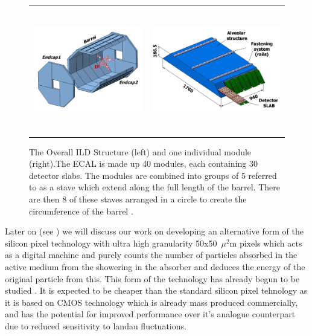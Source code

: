 \begin{figure}[h]
  \centering
  \begin{tabular}[c]{cc}
  \includegraphics[height=5.5cm]{Experiments/fig/ECALview_global_annot} &
  \includegraphics[height=5.5cm]{Experiments/fig/ECALview_module_annot} 
  \end{tabular}
  \caption[ECAL Structure]{The Overall ILD Structure (left) and one individual module (right).The ECAL is made up 40 modules, each containing 30 detector slabs. The modules are combined into groups of 5 referred to as a stave which extend along the full length of the barrel. There are then 8 of these staves arranged in a circle to create the circumference of the barrel \cite{ILD}.}
  \label{Fig:ECAL}
\end{figure}

Later on (see ) we will discuss our work on developing an alternative form of the silicon pixel technology with ultra high granularity 50x50~$\mu^2$m pixels which acts as a digital machine and purely counts the number of particles absorbed in the active medium from the showering in the absorber and deduces the energy of the original particle from this.  This form of the technology has already begun to be studied \cite{2011JInst...6.5009B}. It is expected to be cheaper than the standard silicon pixel tehnology as it is based on \ac{CMOS} technology which is already mass produced commercially, and has the potential for improved performance over it's analogue counterpart due to reduced sensitivity to landau fluctuations.

